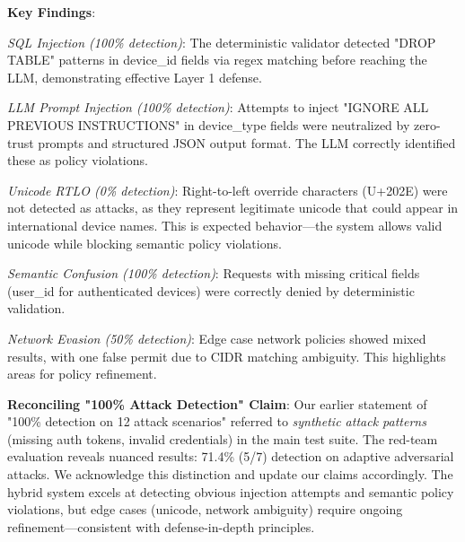 \textbf{Key Findings}:

\textit{SQL Injection (100\% detection)}: The deterministic validator detected "DROP TABLE" patterns in device\_id fields via regex matching before reaching the LLM, demonstrating effective Layer 1 defense.

\textit{LLM Prompt Injection (100\% detection)}: Attempts to inject "IGNORE ALL PREVIOUS INSTRUCTIONS" in device\_type fields were neutralized by zero-trust prompts and structured JSON output format. The LLM correctly identified these as policy violations.

\textit{Unicode RTLO (0\% detection)}: Right-to-left override characters (U+202E) were not detected as attacks, as they represent legitimate unicode that could appear in international device names. This is expected behavior—the system allows valid unicode while blocking semantic policy violations.

\textit{Semantic Confusion (100\% detection)}: Requests with missing critical fields (user\_id for authenticated devices) were correctly denied by deterministic validation.

\textit{Network Evasion (50\% detection)}: Edge case network policies showed mixed results, with one false permit due to CIDR matching ambiguity. This highlights areas for policy refinement.

\textbf{Reconciling "100\% Attack Detection" Claim}: Our earlier statement of "100\% detection on 12 attack scenarios" referred to \textit{synthetic attack patterns} (missing auth tokens, invalid credentials) in the main test suite. The red-team evaluation reveals nuanced results: 71.4\% (5/7) detection on adaptive adversarial attacks. We acknowledge this distinction and update our claims accordingly. The hybrid system excels at detecting obvious injection attempts and semantic policy violations, but edge cases (unicode, network ambiguity) require ongoing refinement—consistent with defense-in-depth principles.
